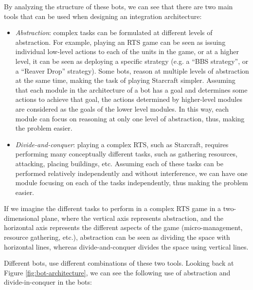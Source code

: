 \documentclass[journal]{IEEEtran}
\begin{document}
By analyzing the structure of these bots, we can see that there are two main tools that can be used when designing an integration architecture:

\begin{itemize}
\item {\em Abstraction}: complex tasks can be formulated at different levels of abstraction. For example, playing an RTS game can be seen as issuing individual low-level actions to each of the units in the game, or at a higher level, it can be seen as deploying a specific strategy (e.g. a ``BBS strategy'', or a ``Reaver Drop'' strategy). Some bots, reason at multiple levels of abstraction at the same time, making the task of playing Starcraft simpler. Assuming that each module in the architecture of a bot has a goal and determines some actions to achieve that goal, the actions determined by higher-level modules are considered as the goals of the lower level modules. In this way, each module can focus on reasoning at only one level of abstraction, thus, making the problem easier.

\item {\em Divide-and-conquer}: playing a complex RTS, such as Starcraft, requires performing many conceptually different tasks, such as gathering resources, attacking, placing buildings, etc. Assuming each of these tasks can be performed relatively independently and without interference, we can have one module focusing on each of the tasks independently, thus making the problem easier. 
\end{itemize}

If we imagine the different tasks to perform in a complex RTS game in a two-dimensional plane, where the vertical axis represents abstraction, and the horizontal axis represents the different aspects of the game (micro-management, resource gathering, etc.), abstraction can be seen as dividing the space with horizontal lines, whereas divide-and-conquer divides the space using vertical lines.

Different bots, use different combinations of these two tools. Looking back at Figure \ref{fig:bot-architecture}, we can see the following use of abstraction and divide-in-conquer in the bots:
\end{document}
